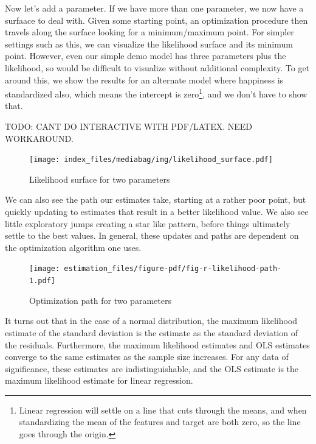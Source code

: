 \documentclass[
  letterpaper,
]{krantz}
\begin{document}
Now let's add a parameter. If we have more than one parameter, we now
have a surfaace to deal with. Given some starting point, an optimization
procedure then travels along the surface looking for a minimum/maximum
point. For simpler settings such as this, we can visualize the
likelihood surface and its minimum point. However, even our simple demo
model has three parameters plus the likelihood, so would be difficult to
visualize without additional complexity. To get around this, we show the
results for an alternate model where happiness is standardized also,
which means the intercept is zero\footnote{Linear regression will settle
  on a line that cuts through the means, and when standardizing the mean
  of the features and target are both zero, so the line goes through the
  origin.}, and we don't have to show that.

TODO: CANT DO INTERACTIVE WITH PDF/LATEX. NEED WORKAROUND.

\begin{figure}

{\centering \texttt{[image: index\_files/mediabag/img/likelihood\_surface.pdf]}

}

\caption{\label{fig-show-r-likelihood-surface}Likelihood surface for two
parameters}

\end{figure}

We can also see the path our estimates take, starting at a rather poor
point, but quickly updating to estimates that result in a better
likelihood value. We also see little exploratory jumps creating a star
like pattern, before things ultimately settle to the best values. In
general, these updates and paths are dependent on the optimization
algorithm one uses.

\begin{figure}

{\centering \texttt{[image: estimation\_files/figure-pdf/fig-r-likelihood-path-1.pdf]}

}

\caption{\label{fig-r-likelihood-path}Optimization path for two
parameters}

\end{figure}

It turns out that in the case of a normal distribution, the maximum
likelihood estimate of the standard deviation is the estimate as the
standard deviation of the residuals. Furthermore, the maximum likelihood
estimates and OLS estimates converge to the same estimates as the sample
size increases. For any data of significance, these estimates are
indistinguishable, and the OLS estimate is the maximum likelihood
estimate for linear regression.
\end{document}
